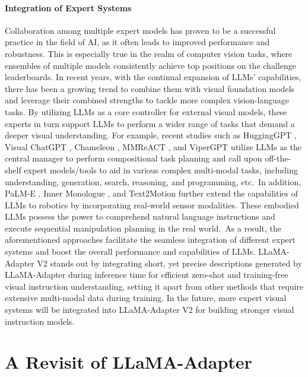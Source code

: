 \documentclass[10pt,twocolumn,letterpaper]{article}
\begin{document}
\paragraph{Integration of Expert Systems}
Collaboration among multiple expert models has proven to be a successful practice in the field of AI, as it often leads to improved performance and robustness. This is especially true in the realm of computer vision tasks, where ensembles of multiple models consistently achieve top positions on the challenge leaderboards. 
In recent years, with the continual expansion of LLMs' capabilities, there has been a growing trend \cite{qin2023tool,wu2023visual,shen2023hugginggpt,ge2023openagi,lu2023chameleon,yang2023mm,lin2023text2motion,driess2023palm,huang2022inner,gupta2022visual,suris2023vipergpt,zhu2022pointclip} to combine them with visual foundation models and leverage their combined strengths to tackle more complex vision-language tasks. By utilizing LLMs as a core controller for external visual models, these experts in turn support LLMs to perform a wider range of tasks that demand a deeper visual understanding. For example, recent studies such as HuggingGPT \cite{shen2023hugginggpt}, Visual ChatGPT \cite{wu2023visual}, Chameleon \cite{lu2023chameleon}, MMReACT \cite{yang2023mm}, and  ViperGPT \cite{suris2023vipergpt} utilize LLMs as the central manager to perform compositional task planning and call upon off-the-shelf expert models/tools to aid in various complex multi-modal tasks, including understanding, generation, search, reasoning, and programming, etc.~In addition, PaLM-E \cite{driess2023palm}, Inner Monologue \cite{huang2022inner}, and Text2Motion \cite{lin2023text2motion} further extend the capabilities of LLMs to robotics by incorporating real-world sensor modalities. These embodied LLMs possess the power to comprehend natural language instructions and execute sequential manipulation planning in the real world.~As a result, the aforementioned approaches facilitate the seamless integration of different expert systems and boost the overall performance and capabilities of LLMs.
LLaMA-Adapter V2 stands out by integrating short, yet precise descriptions generated by LLaMA-Adapter during inference time for efficient zero-shot and training-free visual instruction understanding, setting it apart from other methods that require extensive multi-modal data during training. In the future, more expert visual systems will be integrated into LLaMA-Adapter V2 for building stronger visual instruction models. 


\section{A Revisit of LLaMA-Adapter}
\label{sec:preliminary}
\end{document}
